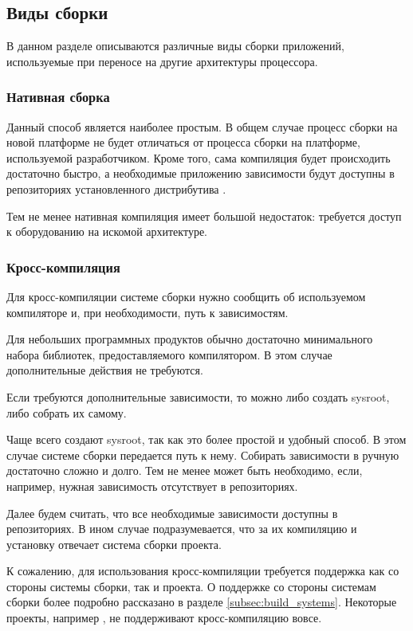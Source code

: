 \subsection{Виды сборки}

В данном разделе описываются различные виды сборки приложений, используемые при переносе на другие архитектуры процессора.

\subsubsection{Нативная сборка}

Данный способ является наиболее простым.
В общем случае процесс сборки на новой платформе не будет отличаться от процесса сборки на платформе, используемой разработчиком.
Кроме того, сама компиляция будет происходить достаточно быстро, а необходимые приложению зависимости будут доступны в репозиториях установленного дистрибутива \linux{}.

Тем не менее нативная компиляция имеет большой недостаток: требуется доступ к оборудованию на искомой архитектуре.

\subsubsection{Кросс-компиляция}

Для кросс-компиляции системе сборки нужно сообщить об используемом компиляторе и, при необходимости, путь к зависимостям.

Для небольших программных продуктов обычно достаточно минимального набора библиотек, предоставляемого компилятором.
В этом случае дополнительные действия не требуются.

Если требуются дополнительные зависимости, то можно либо создать sysroot, либо собрать их самому.

Чаще всего создают sysroot, так как это более простой и удобный способ.
В этом случае системе сборки передается путь к нему.
Собирать зависимости в ручную достаточно сложно и долго.
Тем не менее может быть необходимо, если, например, нужная зависимость отсутствует в репозиториях.

Далее будем считать, что все необходимые зависимости доступны в репозиториях.
В ином случае подразумевается, что за их компиляцию и установку отвечает система сборки проекта.

К сожалению, для использования кросс-компиляции требуется поддержка как со стороны системы сборки, так и проекта.
О поддержке со стороны системам сборки более подробно рассказано в разделе \ref{subsec:build_systems}.
Некоторые проекты, например \OCaml{}, не поддерживают кросс-компиляцию вовсе.

